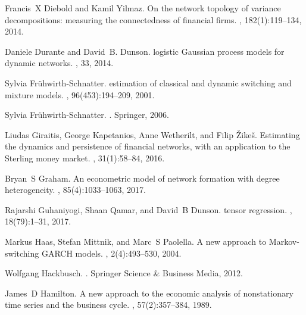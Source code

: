 \documentclass[12pt,a4paper]{article}
\theoremstyle{custom}
\begin{document}
\begin{thebibliography}{10}
Francis~X Diebold and Kamil Yilmaz.
\newblock On the network topology of variance decompositions: measuring the
  connectedness of financial firms.
, 182(1):119--134, 2014.

Daniele Durante and David~B. Dunson.
 logistic {Gaussian} process models for dynamic networks.
, 33, 2014.

Sylvia Fr{\"u}hwirth-Schnatter.
 estimation of classical and dynamic
  switching and mixture models.
,
  96(453):194--209, 2001.

Sylvia Fr{\"u}hwirth-Schnatter.
.
\newblock Springer, 2006.

Liudas Giraitis, George Kapetanios, Anne Wetherilt, and Filip
  {\v{Z}}ike{\v{s}}.
\newblock Estimating the dynamics and persistence of financial networks, with
  an application to the {Sterling} money market.
, 31(1):58--84, 2016.

Bryan~S Graham.
\newblock An econometric model of network formation with degree heterogeneity.
, 85(4):1033--1063, 2017.

Rajarshi Guhaniyogi, Shaan Qamar, and David~B Dunson.
 tensor regression.
, 18(79):1--31, 2017.

Markus Haas, Stefan Mittnik, and Marc~S Paolella.
\newblock A new approach to {Markov-switching} {GARCH} models.
, 2(4):493--530, 2004.

Wolfgang Hackbusch.
.
\newblock Springer Science \& Business Media, 2012.

James~D Hamilton.
\newblock A new approach to the economic analysis of nonstationary time series
  and the business cycle.
, 57(2):357--384, 1989.


\end{thebibliography}
\end{document}
